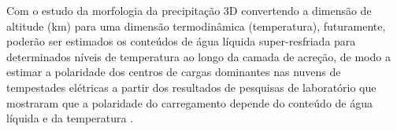 Com o estudo da morfologia da precipitação 3D convertendo a dimensão de altitude (km) para uma dimensão termodinâmica (temperatura), futuramente, poderão ser estimados os conteúdos de água líquida super-resfriada \cite{sekhon1971, hagen2003} para determinados níveis de temperatura ao longo da camada de acreção, de modo a estimar a polaridade dos centros de cargas dominantes nas nuvens de tempestades elétricas a partir dos resultados de pesquisas de laboratório que mostraram que a polaridade do carregamento depende do conteúdo de água líquida e da temperatura \cite{Takahashi1978,Saunders1999,saunders2008}.



